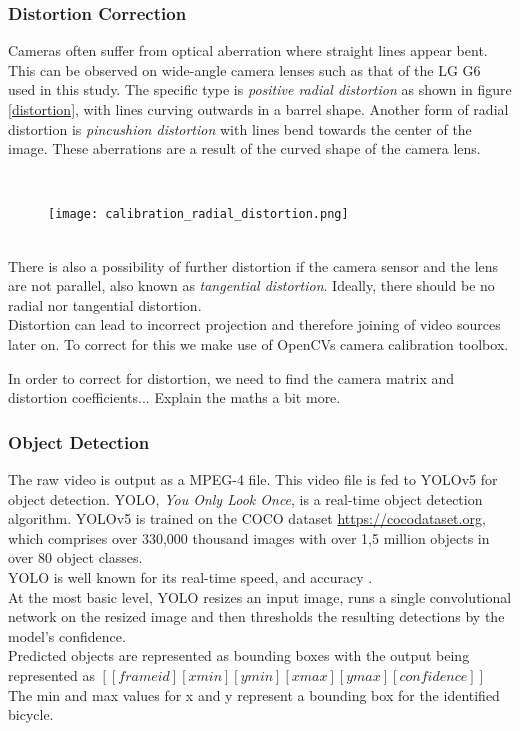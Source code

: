 \subsubsection{Distortion Correction}

Cameras often suffer from optical aberration where straight lines appear bent. This can be observed on wide-angle camera lenses such as that of the LG G6 used in this study.
The specific type is \textit{positive radial distortion} as shown in figure \ref{distortion}, with lines curving outwards in a barrel shape.
Another form of radial distortion is \textit{pincushion distortion} with lines bend towards the center of the image. These aberrations are a result 
of the curved shape of the camera lens.

\ \\ 
\begin{figure}[h]
  \texttt{[image: calibration\_radial\_distortion.png]}
  \centering 
  \end{figure}
  \label{distortion}

\ \\

There is also a possibility of further distortion if the camera sensor and the lens are not parallel, also known as \textit{tangential distortion}.
Ideally, there should be no radial nor tangential distortion.
\ \\
Distortion can lead to incorrect projection and therefore joining of video sources later on.
To correct for this we make use of OpenCVs \cite{noauthor_opencv/opencv_2021} camera calibration toolbox.

\color{red}
In order to correct for distortion, we need to find the camera matrix and distortion coefficients... Explain the maths a bit more.
\color{black}
\ \\
\subsubsection{Object Detection}

The raw video is output as a MPEG-4 file. This video file is fed to YOLOv5 for object detection. YOLO, \textit{You Only Look Once},
is a real-time object detection algorithm. YOLOv5 is trained on the COCO dataset \url{https://cocodataset.org}, which comprises over 330,000 thousand images
with over 1,5 million objects in over 80 object classes.
\ \\ 
YOLO is well known for its real-time speed, and accuracy \cite{redmon2016look}.
\ \\ 
At the most basic level, YOLO resizes an input image, runs a single convolutional network on the resized image
and then thresholds the resulting detections by the model’s confidence.
\ \\ 
Predicted objects are represented as bounding boxes with the output being represented as $[[frame id][xmin][ymin][xmax][ymax][confidence]]$
\ \\
The min and max values for x and y represent a bounding box for the identified bicycle.

